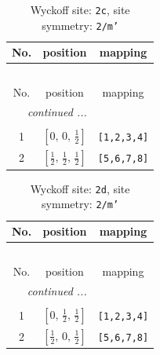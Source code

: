 \documentclass[fleqn,8pt]{jsarticle}
\begin{document}
\begin{longtable}{ccc}
\caption{Wyckoff site: {\tt 2c}, site symmetry: {\tt 2/m'}}
 \\
 \hline \hline
No. & position & mapping \\ \hline \endfirsthead

\multicolumn{2}{l}{\tablename\ \thetable{}} \\
 \hline \hline
No. & position & mapping \\ \hline \endhead

 \hline \hline
\multicolumn{2}{r}{\footnotesize\it continued ...} \\ \endfoot

 \hline \hline
\multicolumn{2}{r}{} \\ \endlastfoot

1 & $\left[ 0,\, 0,\, \frac{1}{2} \right]$ & {\tt [1,2,3,4]} \\ \hline
2 & $\left[ \frac{1}{2},\, \frac{1}{2},\, \frac{1}{2} \right]$ & {\tt [5,6,7,8]} \\
\end{longtable}
\renewcommand{\arraystretch}{1.2}
\begin{longtable}{ccc}
\caption{Wyckoff site: {\tt 2d}, site symmetry: {\tt 2/m'}}
 \\
 \hline \hline
No. & position & mapping \\ \hline \endfirsthead

\multicolumn{2}{l}{\tablename\ \thetable{}} \\
 \hline \hline
No. & position & mapping \\ \hline \endhead

 \hline \hline
\multicolumn{2}{r}{\footnotesize\it continued ...} \\ \endfoot

 \hline \hline
\multicolumn{2}{r}{} \\ \endlastfoot

1 & $\left[ 0,\, \frac{1}{2},\, \frac{1}{2} \right]$ & {\tt [1,2,3,4]} \\ \hline
2 & $\left[ \frac{1}{2},\, 0,\, \frac{1}{2} \right]$ & {\tt [5,6,7,8]} \\
\end{longtable}
\renewcommand{\arraystretch}{1.2}
\end{document}
